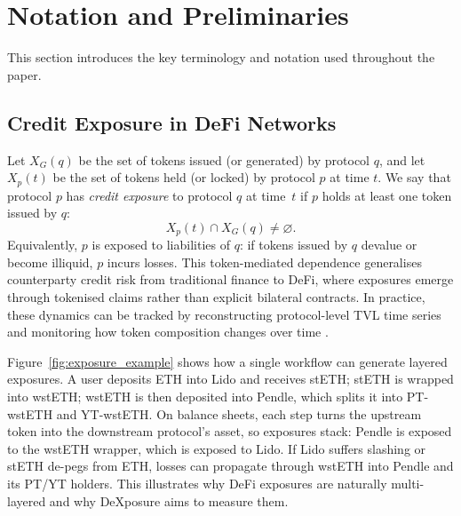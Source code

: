 \section{Notation and Preliminaries}

This section introduces the key terminology and notation used throughout the paper.

\subsection{Credit Exposure in DeFi Networks}

Let $X_G(q)$ be the set of tokens issued (or generated) by protocol $q$, and let $X_p(t)$ be the set of tokens held (or locked) by protocol $p$ at time $t$. We say that protocol $p$ has \emph{credit exposure} to protocol $q$ at time~$t$ if $p$ holds at least one token issued by $q$:
\begin{equation}
X_p(t)\cap X_G(q)\neq \varnothing.
\label{eq:credit-exposure-definition}
\end{equation}
Equivalently, $p$ is exposed to liabilities of $q$: if tokens issued by $q$ devalue or become illiquid, $p$ incurs losses. This token-mediated dependence generalises counterparty credit risk from traditional finance to DeFi, where exposures emerge through tokenised claims rather than explicit bilateral contracts. In practice, these dynamics can be tracked by reconstructing protocol-level TVL time series and monitoring how token composition changes over time \cite{wu2025dexposuredatasetbenchmarksinterprotocol}.

Figure~\ref{fig:exposure_example} shows how a single workflow can generate layered exposures. A user deposits ETH into Lido and receives stETH; stETH is wrapped into wstETH; wstETH is then deposited into Pendle, which splits it into PT-wstETH and YT-wstETH. On balance sheets, each step turns the upstream token into the downstream protocol's asset, so exposures stack: Pendle is exposed to the wstETH wrapper, which is exposed to Lido. If Lido suffers slashing or stETH de-pegs from ETH, losses can propagate through wstETH into Pendle and its PT/YT holders. This illustrates why DeFi exposures are naturally multi-layered and why DeXposure aims to measure them.

